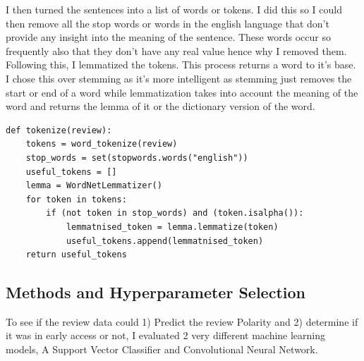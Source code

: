 \documentclass[11pt]{article} %
\begin{document}
I then turned the sentences into a list of words or tokens.  I did this so I could then remove all the stop words or words in the english language that don't provide any insight into the meaning of the sentence.  These words occur so frequently also that they don't have any real value hence why I removed them.  Following this,  I lemmatized the tokens.  This process returns a word to it's base.  I chose this over stemming as it's more intelligent as stemming just removes the start or end of a word while lemmatization takes into account the meaning of the word and returns the lemma of it or the dictionary version of the word.
\begin{verbatim}
def tokenize(review):
    tokens = word_tokenize(review)
    stop_words = set(stopwords.words("english"))
    useful_tokens = []
    lemma = WordNetLemmatizer()
    for token in tokens:
        if (not token in stop_words) and (token.isalpha()):
            lemmatnised_token = lemma.lemmatize(token)
            useful_tokens.append(lemmatnised_token)
    return useful_tokens
\end{verbatim}
\subsection{Methods and Hyperparameter Selection}
To see if the review data could 1) Predict the review Polarity and 2) determine if it was in early access or not,  I evaluated 2 very different machine learning models,  A Support Vector Classifier and Convolutional Neural Network.  
\end{document}

